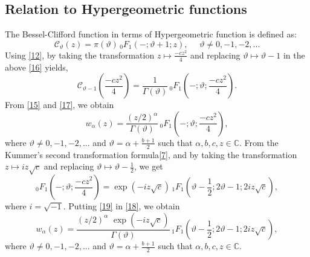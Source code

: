 \documentclass{amsart}
\theoremstyle{definition}
\theoremstyle{remark}
\numberwithin{equation}{section}
\begin{document}
\subsection{Relation to Hypergeometric functions}
The Bessel-Clifford function in terms of Hypergeometric function is defined as\cite{Wat}:
\begin{equation}\label{16}
  \mathcal{C}_{\vartheta} (z) = \pi(\vartheta)\,  _{0}F_{1} (-; \vartheta+1; z),\,\,\,\,\,\,\,\, \vartheta \neq 0,-1,-2,...
\end{equation}Using \eqref{12}, by taking the transformation $z\mapsto \frac{-cz^{2}}{4}$ and replacing $\vartheta \mapsto \vartheta-1$ in the above \eqref{16} yields,
\begin{equation}\label{17}
  \mathcal{C}_{\vartheta-1} \left(\frac{-cz^{2}}{4}\right) = \frac{1}{\Gamma(\vartheta)}\, _{0}F_{1} \left(-; \vartheta;\frac{-cz^{2}}{4} \right).
\end{equation}
From \eqref{15} and \eqref{17}, we obtain
\begin{equation}\label{18}
  w_{\alpha} (z) = \frac{(z/2)^{\alpha}}{\Gamma (\vartheta)}\, _{0}F_{1} \left(-; \vartheta;\frac{-cz^{2}}{4} \right),
\end{equation}where $\vartheta \neq0,-1,-2,...$ and $\vartheta = \alpha + \frac{b+1}{2}$ such that $\alpha,b,c,z \in \mathbb{C}$.
From the Kummer's second transformation formula\eqref{7}, and by taking the transformation $z\mapsto iz \sqrt{c}$ and replacing $\vartheta \mapsto \vartheta - \frac{1}{2}$, we get
\begin{equation}\label{19}
  _{0}F_{1} \left(-; \vartheta;\frac{-cz^{2}}{4} \right) = \exp(-i z \sqrt{c})\, _{1}F_{1} \left(\vartheta-\frac{1}{2}; 2{\vartheta}-1; 2i z \sqrt{c} \right),
\end{equation}where $i=\sqrt{-1}$. Putting \eqref{19} in \eqref{18}, we obtain
\begin{equation}\label{20}
  w_{\alpha} (z) = \frac{(z/2)^{\alpha}\, \, \exp(-i z \sqrt{c})}{\Gamma(\vartheta)} \, _{1}F_{1} \left(\vartheta-\frac{1}{2}; 2{\vartheta}-1; 2i z \sqrt{c} \right),
\end{equation} where $\vartheta \neq0,-1,-2,...$ and $\vartheta = \alpha + \frac{b+1}{2}$ such that $\alpha,b,c,z \in \mathbb{C}$.
\end{document}
